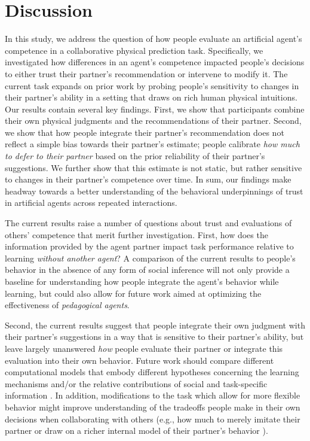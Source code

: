 \documentclass[10pt,letterpaper]{article}
\begin{document}
\section{Discussion}

In this study, we address the question of how people evaluate an artificial agent's competence in a collaborative physical prediction task. Specifically, we investigated how differences in an agent's competence impacted people's decisions to either trust their partner's recommendation or intervene to modify it. The current task expands on prior work by probing people's sensitivity to changes in their partner's ability in a setting that draws on rich human physical intuitions. 
Our results contain several key findings. First, we show that participants combine their own physical judgments and the recommendations of their partner. Second, we show that how people integrate their partner's recommendation does not reflect a simple bias towards their partner's estimate; people calibrate \textit{how much to defer to their partner} based on the prior reliability of their partner's suggestions. We further show that this estimate is not static, but rather sensitive to changes in their partner's competence over time. In sum, our findings make headway towards a better understanding of the behavioral underpinnings of trust in artificial agents across repeated interactions. 

The current results raise a number of questions about trust and evaluations of others' competence that merit further investigation. First, how does the information provided by the agent partner impact task performance relative to learning \textit{without another agent}? A comparison of the current results to people's behavior in the absence of any form of social inference will not only provide a baseline for understanding how people integrate the agent's behavior while learning, but could also allow for future work aimed at optimizing the effectiveness of \textit{pedagogical agents}. 

Second, the current results suggest that people integrate their own judgment with their partner's suggestions in a way that is sensitive to their partner's ability, but leave largely unanswered \textit{how} people evaluate their partner or integrate this evaluation into their own behavior. Future work should compare different computational models that embody different hypotheses concerning the learning mechanisms and/or the relative contributions of social and task-specific information \cite{parnamets2020integration}. In addition, modifications to the task which allow for more flexible behavior might improve understanding of the tradeoffs people make in their own decisions when collaborating with others (e.g., how much to merely imitate their partner or draw on a richer internal model of their partner's behavior \cite{charpentier2020neuro}). 
\end{document}

